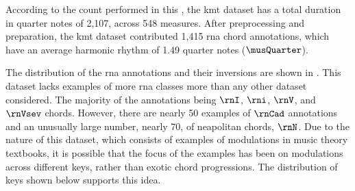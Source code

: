 
According to the count performed in this \thesisdiss{}, the
\gls{kmt} dataset has a total duration in quarter notes of
2,107, across 548 measures. After preprocessing and
preparation, the \gls{kmt} dataset contributed 1,415
\gls{rna} chord annotations, which have an average harmonic
rhythm of 1.49 quarter notes ($\musQuarter$).

The distribution of the \gls{rna} annotations and their
inversions are shown in . This
dataset lacks examples of more \gls{rna} classes more than
any other dataset considered. The majority of the
annotations being $\rnI$, $\rni$, $\rnV$, and $\rnVsev$
chords. However, there are nearly 50 examples of $\rnCad$
annotations and an unusually large number, nearly 70, of
\gls{neapolitan} chords, $\rnN$. Due to the nature of this
dataset, which consists of examples of modulations in music
theory textbooks, it is possible that the focus of the
examples has been on modulations across different keys,
rather than exotic chord progressions. The distribution of
keys shown below supports this idea.




